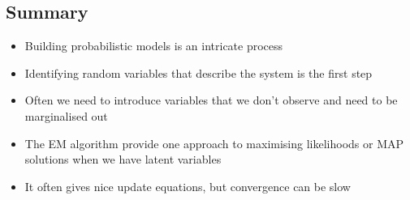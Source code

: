 \begin{slide}
\section{Summary}

\begin{PauseHighLight}
  \begin{itemize}
  \item Building probabilistic models is an intricate process\pause
  \item Identifying random variables that describe the system is the
    first step\pause
  \item Often we need to introduce variables that we don't observe and
    need to be marginalised out\pause
  \item The EM algorithm provide one approach to maximising
    likelihoods or MAP solutions when we have latent variables\pause
  \item It often gives nice update equations, but convergence can be
    slow\pause
  \end{itemize}
\end{PauseHighLight}

\end{slide}


